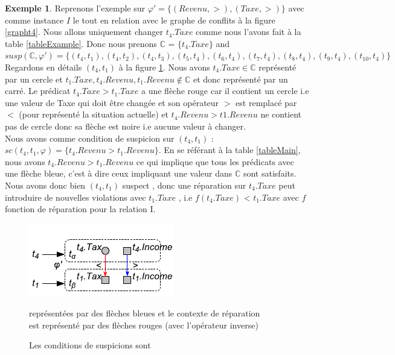 \documentclass[letterpaper, 12pt]{report}
\theoremstyle{definition}
\newtheorem{myexample}{Exemple}
\begin{document}
\begin{myexample}

Reprenons l'exemple sur $\varphi' = \{(Revenu,>),(Taxe,>) \}$ avec comme instance $I$ le tout en relation avec le graphe de conflits à la figure \ref{grapht4}. Nous allons uniquement changer $t_4.Taxe$ comme nous l'avons fait à la table \ref{tableExample}. Donc nous prenons $\mathbb{C}$ =  $\{ t_4.Taxe \}$ and $susp(\mathbb{C},\varphi') = \{( t_4 , t_1) , 
( t_4 , t_2),
( t_4 , t_3),
( t_5 , t_4),
( t_6 , t_4),
( t_7 , t_4),
( t_8 , t_4),
( t_9 , t_4),
( t_{10} , t_4) \}$ Regardons en détails $(t_4,t_1)$ à la figure \ref{fig3}. Nous avons $t_4.Taxe \in \mathbb{C}$ représenté par un cercle et $t_1.Taxe, t_4.Revenu, t_1.Revenu \not\in \mathbb{C}$ et donc représenté par un carré. Le prédicat $t_4.Taxe > t_1.Taxe$ a une flèche rouge car il contient un cercle i.e une valeur de Taxe qui doit être changée et son opérateur $>$ est remplacé par $<$ (pour représenté la situation actuelle) et $t_4.Revenu > t1.Revenu$ ne contient pas de cercle donc sa flèche est noire i.e aucune valeur à changer. \\

Nous avons comme condition de suspicion sur $(t_4,t_1)$ : $sc(t_4,t_1,\varphi) = \{ t_4.Revenu > t_1.Revenu\}$. En se référant à la table \ref{tableMain}, nous avons $t_4.Revenu > t_1.Revenu$ ce qui implique que tous les prédicats avec une flèche bleue, c'est à dire ceux impliquant une valeur dans $\mathbb{C}$ sont satisfaits. Nous avons donc bien $(t_4,t_1)$ suspect , donc une réparation sur $t_4.Taxe$ peut introduire de nouvelles violations avec $t_1.Taxe$ , i.e $f(t_4.Taxe)$ < $t_1.Taxe$ avec $f$ fonction de réparation pour la relation I.
\end{myexample}

\begin{figure}
	\centering
	\includegraphics[scale=1]{img/fig3}
	\caption{\label{fig3}Les conditions de suspicions sont} représentées par des flèches bleues et le contexte de réparation \\
	est représenté par des flèches rouges (avec l'opérateur inverse) \\
\end{figure}
\end{document}
